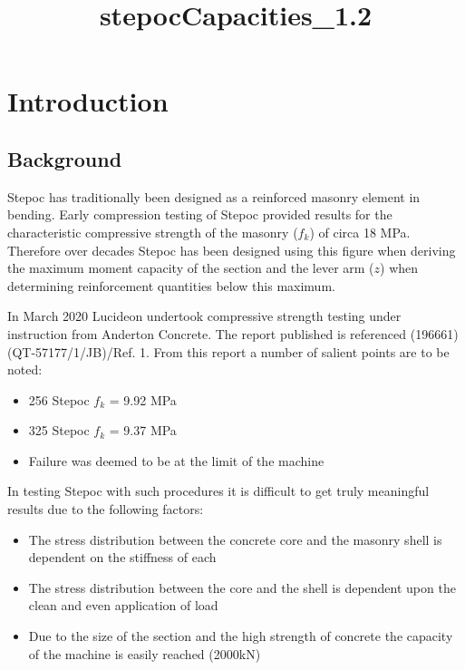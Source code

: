 \documentclass[11pt]{article}
\title{stepocCapacities\_1.2}
\providecommand{\tightlist}{%
      \setlength{\itemsep}{0pt}\setlength{\parskip}{0pt}}
\begin{document}
    
    \maketitle
    
    

    
    \hypertarget{introduction}{%
\section{Introduction}\label{introduction}}

\hypertarget{background}{%
\subsection{Background}\label{background}}

Stepoc has traditionally been designed as a reinforced masonry element
in bending. Early compression testing of Stepoc provided results for the
characteristic compressive strength of the masonry (\(f_k\)) of circa 18
MPa. Therefore over decades Stepoc has been designed using this figure
when deriving the maximum moment capacity of the section and the lever
arm (\(z\)) when determining reinforcement quantities below this
maximum.

In March 2020 Lucideon undertook compressive strength testing under
instruction from Anderton Concrete. The report published is referenced
(196661) (QT-57177/1/JB)/Ref. 1. From this report a number of salient
points are to be noted:

\begin{itemize}
\tightlist
\item
  256 Stepoc \(f_k\) = 9.92 MPa
\item
  325 Stepoc \(f_k\) = 9.37 MPa
\item
  Failure was deemed to be at the limit of the machine
\end{itemize}

In testing Stepoc with such procedures it is difficult to get truly
meaningful results due to the following factors:

\begin{itemize}
\tightlist
\item
  The stress distribution between the concrete core and the masonry
  shell is dependent on the stiffness of each
\item
  The stress distribution between the core and the shell is dependent
  upon the clean and even application of load
\item
  Due to the size of the section and the high strength of concrete the
  capacity of the machine is easily reached (2000kN)
\end{itemize}
\end{document}
